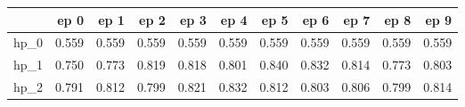 \begin{tabular}{lrrrrrrrrrr}
\toprule
{} &   ep 0 &   ep 1 &   ep 2 &   ep 3 &   ep 4 &   ep 5 &   ep 6 &   ep 7 &   ep 8 &   ep 9 \\
\midrule
hp\_0 &  0.559 &  0.559 &  0.559 &  0.559 &  0.559 &  0.559 &  0.559 &  0.559 &  0.559 &  0.559 \\
hp\_1 &  0.750 &  0.773 &  0.819 &  0.818 &  0.801 &  0.840 &  0.832 &  0.814 &  0.773 &  0.803 \\
hp\_2 &  0.791 &  0.812 &  0.799 &  0.821 &  0.832 &  0.812 &  0.803 &  0.806 &  0.799 &  0.814 \\
\bottomrule
\end{tabular}
